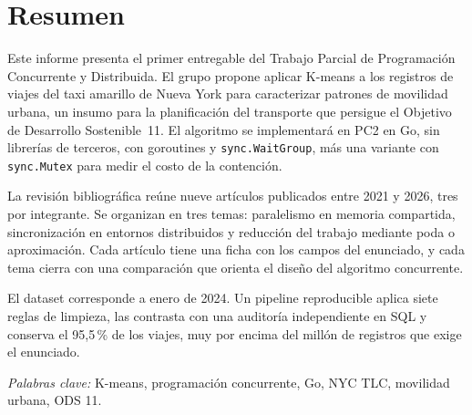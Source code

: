 \section*{Resumen}

Este informe presenta el primer entregable del Trabajo Parcial de Programación Concurrente y
Distribuida. El grupo propone aplicar K-means a los registros de viajes del taxi amarillo de Nueva
York \parencite{nyctlc} para caracterizar patrones de movilidad urbana, un insumo para la
planificación del transporte que persigue el Objetivo de Desarrollo Sostenible~11. El algoritmo se
implementará en PC2 en Go, sin librerías de terceros, con goroutines y \texttt{sync.WaitGroup}, más una variante con
\texttt{sync.Mutex} para medir el costo de la contención.

La revisión bibliográfica reúne nueve artículos publicados entre 2021 y 2026, tres por integrante.
Se organizan en tres temas: paralelismo en memoria compartida, sincronización en entornos
distribuidos y reducción del trabajo mediante poda o aproximación. Cada artículo tiene una ficha
con los campos del enunciado, y cada tema cierra con una comparación que orienta el diseño del
algoritmo concurrente.

El dataset corresponde a enero de 2024. Un pipeline reproducible aplica siete reglas de limpieza,
las contrasta con una auditoría independiente en SQL y conserva el 95,5\,\% de los viajes, muy por
encima del millón de registros que exige el enunciado.

\textit{Palabras clave:} K-means, programación concurrente, Go, NYC TLC, movilidad urbana, ODS 11.

